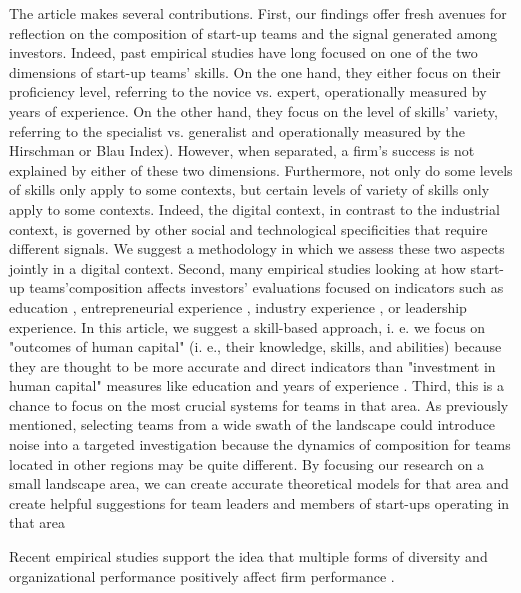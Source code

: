 \documentclass[12pt]{article}
\begin{document}
The article makes several contributions. First, our findings offer fresh avenues for reflection on the composition of start-up teams and the signal generated among investors. Indeed, past empirical studies have long focused on one of the two dimensions of start-up teams' skills. On the one hand, they either focus on their proficiency level, referring to the novice vs. expert, operationally measured by years of experience. On the other hand, they focus on the level of skills' variety, referring to the specialist vs. generalist and operationally measured by the Hirschman or Blau Index). However, when separated, a firm's success is not explained by either of these two dimensions. Furthermore, not only do some levels of skills only apply to some contexts, but certain levels of variety of skills only apply to some contexts. Indeed, the digital context, in contrast to the industrial context, is governed by other social and technological specificities that require different signals. We suggest a methodology in which we assess these two aspects jointly in a digital context. Second, many empirical studies looking at how start-up teams'composition affects investors' evaluations focused on indicators such as education \citep{franke2008venture}, entrepreneurial experience \citep{beckman2007early}, industry experience \citep{becker2015new}, or leadership experience\citep{hoenig2015quality}. In this article, we suggest a skill-based approach, i. e. we focus on "outcomes of human capital" (i. e., their knowledge, skills, and abilities) because they are thought to be more accurate and direct indicators than "investment in human capital" measures like education and years of experience \citep{unger2011human, marvel2016human}. Third, this is a chance to focus on the most crucial systems for teams in that area. As previously mentioned, selecting teams from a wide swath of the landscape could introduce noise into a targeted investigation because the dynamics of composition for teams located in other regions may be quite different. By focusing our research on a small landscape area, we can create accurate theoretical models for that area and create helpful suggestions for team leaders and members of start-ups operating in that area


Recent empirical studies support the idea that multiple forms of diversity and organizational performance positively affect firm performance \citep{zhou2015entrepreneurial}.

\end{document}

